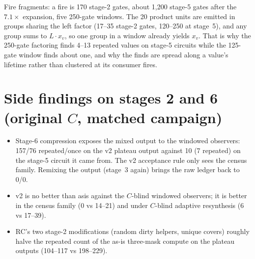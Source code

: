 \documentclass[11pt]{article}
\begin{document}
Fire fragments: a fire is 170 stage-2 gates, about 1,200 stage-5 gates after the $7.1\times$ expansion, five 250-gate windows. The 20 product units are emitted in groups sharing the left factor (17--35 stage-2 gates, 120--250 at stage~5), and any group sums to $L\cdot x_v$, so one group in a window already yields $x_v$. That is why the 250-gate factoring finds 4--13 repeated values on stage-5 circuits while the 125-gate window finds about one, and why the finds are spread along a value's lifetime rather than clustered at its consumer fires.

\section{Side findings on stages 2 and 6 (original $C$, matched campaign)}
\begin{center}\footnotesize
{}
\end{center}
\begin{itemize}
\item Stage-6 compression exposes the mixed output to the windowed observers: 157/76 repeated/once on the v2 plateau output against 10 (7 repeated) on the stage-5 circuit it came from. The v2 acceptance rule only sees the census family. Remixing the output (stage~3 again) brings the raw ledger back to 0/0.
\item v2 is no better than asis against the $C$-blind windowed observers; it is better in the census family (0 vs 14--21) and under $C$-blind adaptive resynthesis (6 vs 17--39).
\item RC's two stage-2 modifications (random dirty helpers, unique covers) roughly halve the repeated count of the as-is three-mask compute on the plateau outputs (104--117 vs 198--229).
\end{itemize}
\end{document}

